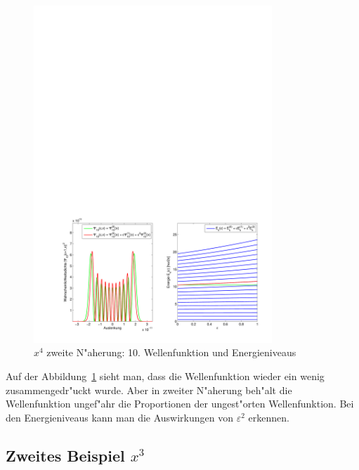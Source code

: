 \begin{refsection}
\begin{figure}	%
\centering
\includegraphics[width=0.8\textwidth]{anharmonisch/images/x4/Stoerung2Wellenfunktion.pdf}
\caption{$x^4$ zweite N"aherung: 10. Wellenfunktion und Energieniveaus  
\label{skript:x4_Stoerung2Wellenfunktion}}
\end{figure}

Auf der Abbildung~\ref{skript:x4_Stoerung2Wellenfunktion} sieht man, dass die
Wellenfunktion wieder ein wenig zusammengedr"uckt wurde.
Aber in zweiter N"aherung beh"alt die Wellenfunktion ungef"ahr die Proportionen
der ungest"orten Wellenfunktion.
Bei den Energieniveaus kann man die Auswirkungen von $\varepsilon^2$ erkennen.

\subsection{Zweites Beispiel $x^3$}


\end{refsection}
